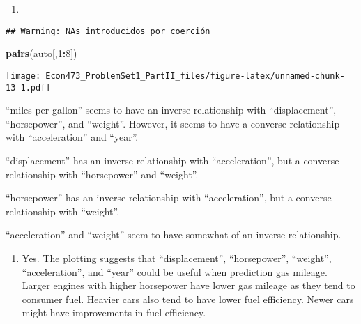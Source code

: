 \documentclass[
]{article}
\newenvironment{Shaded}{\begin{snugshade}}{\end{snugshade}}
\newcommand{\DecValTok}[1]{\textcolor[rgb]{0.00,0.00,0.81}{#1}}
\newcommand{\FunctionTok}[1]{\textcolor[rgb]{0.13,0.29,0.53}{\textbf{#1}}}
\newcommand{\NormalTok}[1]{#1}
\newcommand{\OtherTok}[1]{\textcolor[rgb]{0.56,0.35,0.01}{#1}}
\newcommand{\SpecialCharTok}[1]{\textcolor[rgb]{0.81,0.36,0.00}{\textbf{#1}}}
\providecommand{\tightlist}{%
  \setlength{\itemsep}{0pt}\setlength{\parskip}{0pt}}
\begin{document}
\begin{enumerate}
\def\labelenumi{(\alph{enumi})}
\setcounter{enumi}{4}
\tightlist
\item
\end{enumerate}

\begin{Shaded}
\end{Shaded}

\begin{verbatim}
## Warning: NAs introducidos por coerción
\end{verbatim}

\begin{Shaded}
\begin{Highlighting}[]
\FunctionTok{pairs}\NormalTok{(auto[,}\DecValTok{1}\SpecialCharTok{:}\DecValTok{8}\NormalTok{])}
\end{Highlighting}
\end{Shaded}

\texttt{[image: Econ473\_ProblemSet1\_PartII\_files/figure-latex/unnamed-chunk-13-1.pdf]}

``miles per gallon'' seems to have an inverse relationship with
``displacement'', ``horsepower'', and ``weight''. However, it seems to
have a converse relationship with ``acceleration'' and ``year''.

``displacement'' has an inverse relationship with ``acceleration'', but
a converse relationship with ``horsepower'' and ``weight''.

``horsepower'' has an inverse relationship with ``acceleration'', but a
converse relationship with ``weight''.

``acceleration'' and ``weight'' seem to have somewhat of an inverse
relationship.

\begin{enumerate}
\def\labelenumi{(\alph{enumi})}
\setcounter{enumi}{5}
\tightlist
\item
  Yes. The plotting suggests that ``displacement'', ``horsepower'',
  ``weight'', ``acceleration'', and ``year'' could be useful when
  prediction gas mileage. Larger engines with higher horsepower have
  lower gas mileage as they tend to consumer fuel. Heavier cars also
  tend to have lower fuel efficiency. Newer cars might have improvements
  in fuel efficiency.
\end{enumerate}
\end{document}
